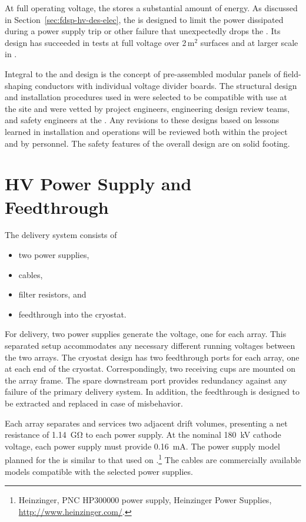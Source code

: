 At full operating voltage, the  stores a substantial amount of energy.
As discussed in Section~\ref{sec:fdsp-hv-des-elec}, the  is designed to limit the power dissipated during a power supply trip or other failure that unexpectedly drops the .
Its design has succeeded in tests at full voltage over \num{2}\,m$^2$ surfaces and at larger scale in .  

Integral to the  and  design is the concept of pre-assembled modular panels of field-shaping conductors with individual voltage divider boards. The structural design and installation procedures used in  were selected to be compatible with use at the  site and were vetted by project engineers, engineering design review teams, and safety engineers at the . Any revisions to these designs based on lessons learned in   installation and operations will be reviewed both within the project and by   personnel. The safety features of the overall design are on solid footing. 

\section {HV Power Supply and Feedthrough}
\label{sec:fdsp-hv-des-hvps}

The  delivery system consists of
\begin{itemize}
\item two power supplies,
\item {} cables,
\item filter resistors, and
\item {} feedthrough into the cryostat.
\end{itemize}

For  delivery, two power supplies generate the voltage, one for each  array. 
This separated setup accommodates any necessary different running voltages between the two  arrays.
The cryostat design has two feedthrough ports for each  array, one at each end of the cryostat. Correspondingly, two  receiving cups are mounted on the  array frame. The spare downstream port provides redundancy against any failure of the primary  delivery system. In addition, the  feedthrough is designed to be extracted and replaced in case of misbehavior.

Each  array separates and services two adjacent drift volumes, 
presenting a net resistance of \SI{1.14}{\giga\ohm} to each power supply. At the nominal \SI{180}{kV} cathode voltage, each power supply must provide \SI{0.16}{mA}. 
The power supply model planned for the  is similar to that used on .\footnote{Heinzinger, PNC HP300000  power supply, Heinzinger\texttrademark{} Power Supplies, \url{http://www.heinzinger.com/}.}  
The  cables are commercially available models compatible with the selected power supplies. 

